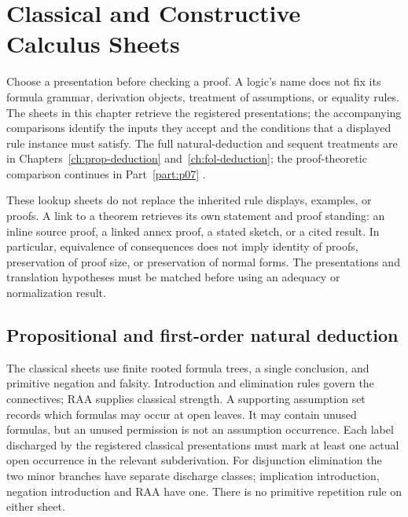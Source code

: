 \chapter{Classical and Constructive Calculus Sheets}
\label{sec:p14-classical-and-constructive-calculi}

Choose a presentation before checking a proof.  A logic's name does not fix
its formula grammar, derivation objects, treatment of assumptions, or equality
rules.  The sheets in this chapter retrieve the registered presentations;
the accompanying comparisons identify the inputs they accept and the
conditions that a displayed rule instance must satisfy.  The full
natural-deduction and sequent treatments are in
Chapters~\ref{ch:prop-deduction} and~\ref{ch:fol-deduction}; the
proof-theoretic comparison continues in Part~\ref{part:p07}
\cite{Gentzen1934a,Kleene1952,Prawitz1965}.

These lookup sheets do not replace the inherited rule displays, examples,
or proofs.  A link to a theorem retrieves its own statement and proof
standing: an inline source proof, a linked annex proof, a stated sketch, or
a cited result.  In particular, equivalence of consequences does not imply
identity of proofs, preservation of proof size, or preservation of normal
forms.  The presentations and translation hypotheses must be matched before
using an adequacy or normalization result.

\section{Propositional and first-order natural deduction}
\label{sec:p14-classical-calculi-natural-deduction}

The classical sheets use finite rooted formula trees, a single conclusion,
and primitive negation and falsity.  Introduction and elimination rules
govern the connectives; RAA supplies classical strength.  A supporting
assumption set records which formulas may occur at open leaves.  It may
contain unused formulas, but an unused permission is not an assumption
occurrence.  Each label discharged by the registered classical presentations
must mark at least one actual open occurrence in the relevant subderivation.
For disjunction elimination the two minor branches have separate discharge
classes; implication introduction, negation introduction and RAA have one.
There is no primitive repetition rule on either sheet.

